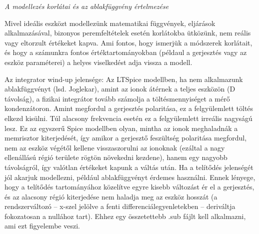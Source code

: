 \textit{A modellezés korlátai és az ablakfüggvény értelmezése}

Mivel ideális eszközt modellezünk matematikai függvények, eljárások alkalmazásával, bizonyos peremfeltételek esetén korlátokba ütközünk, nem reális vagy eltorzult értékeket kapva. Ami fontos, hogy ismerjük a módszerek korlátait, és hogy a számunkra fontos értéktartományokban (példaul a gerjesztés vagy az eszköz paraméterei) a helyes viselkedést adja vissza a modell.\smallskip

Az integrator wind-up jelensége: Az LTSpice modellben, ha nem alkalmazunk ablakfüggvényt (lsd. Joglekar), amint az ionok átérnek a teljes eszközön (D távolság), a fizikai integrátor tovább számolja a töltésmennyiséget a mérő kondenzátoron. Amint megfordul a gerjesztés polaritása, ez a felgyülemlett töltés elkezd kisülni. Túl alacsony frekvencia esetén ez a felgyülemlett irreális nagyságú lesz. Ez az egyszerű Spice modellben olyan, mintha az ionok meghaladnák a memrisztor kiterjedését, így amikor a gerjesztő feszültség polaritása megfordul, nem az eszköz végétől kellene visszaszorulni az ionoknak (ezáltal a nagy ellenállású régió területe rögtön növekedni kezdene), hanem egy nagyobb távolságról, így valótlan értékeket kapunk a váltás után.
Ha a telítődés jelenségét jól akarjuk modellezni, például ablakfüggvényt érdemes használni. Ennek lényege, hogy a telítődés tartományához közelítve egyre kisebb változást ér el a gerjesztés, és az alacsony régió kiterjedése nem haladja meg az eszköz hosszát (a rendszerváltozó – x-szel jelölve a fenti differenciálegyenletekben – deriváltja fokozatosan a nullához tart). Ehhez egy összetettebb .sub fájlt kell alkalmazni, ami ezt figyelembe veszi.
